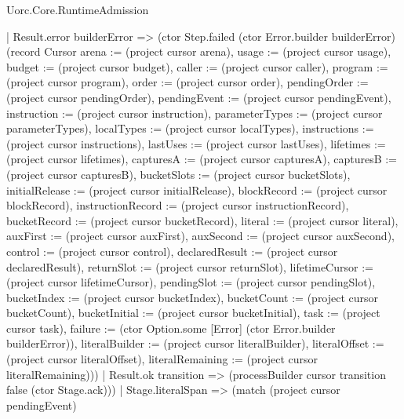 \begin{lexlean}{Uorc.Core.RuntimeAdmission}
\begin{semanticmodule}
{        | Result.error builderError => (ctor Step.failed (ctor Error.builder builderError) (record Cursor {arena := (project cursor arena), usage := (project cursor usage), budget := (project cursor budget), caller := (project cursor caller), program := (project cursor program), order := (project cursor order), pendingOrder := (project cursor pendingOrder), pendingEvent := (project cursor pendingEvent), instruction := (project cursor instruction), parameterTypes := (project cursor parameterTypes), localTypes := (project cursor localTypes), instructions := (project cursor instructions), lastUses := (project cursor lastUses), lifetimes := (project cursor lifetimes), capturesA := (project cursor capturesA), capturesB := (project cursor capturesB), bucketSlots := (project cursor bucketSlots), initialRelease := (project cursor initialRelease), blockRecord := (project cursor blockRecord), instructionRecord := (project cursor instructionRecord), bucketRecord := (project cursor bucketRecord), literal := (project cursor literal), auxFirst := (project cursor auxFirst), auxSecond := (project cursor auxSecond), control := (project cursor control), declaredResult := (project cursor declaredResult), returnSlot := (project cursor returnSlot), lifetimeCursor := (project cursor lifetimeCursor), pendingSlot := (project cursor pendingSlot), bucketIndex := (project cursor bucketIndex), bucketCount := (project cursor bucketCount), bucketInitial := (project cursor bucketInitial), task := (project cursor task), failure := (ctor Option.some [Error] (ctor Error.builder builderError)), literalBuilder := (project cursor literalBuilder), literalOffset := (project cursor literalOffset), literalRemaining := (project cursor literalRemaining)}))
        | Result.ok transition => (processBuilder cursor transition false (ctor Stage.ack)))
      | Stage.literalSpan => (match (project cursor pendingEvent)
}
\end{semanticmodule}
\end{lexlean}
